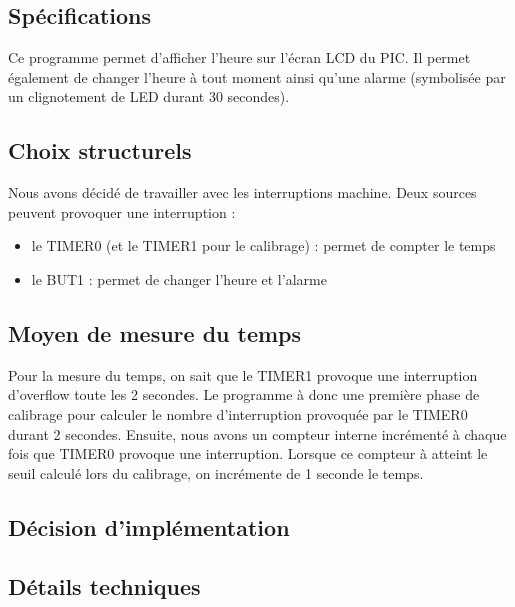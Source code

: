 \subsection*{Spécifications}

Ce programme permet d'afficher l'heure sur l'écran LCD du PIC. Il permet également de changer l'heure à tout moment ainsi qu'une alarme (symbolisée par un clignotement de LED durant 30 secondes).

\subsection*{Choix structurels}

Nous avons décidé de travailler avec les interruptions machine. Deux sources peuvent provoquer une interruption :
\begin{itemize}
	\item le TIMER0 (et le TIMER1 pour le calibrage) : permet de compter le temps
	\item le BUT1 : permet de changer l'heure et l'alarme 
\end{itemize}


\subsection*{Moyen de mesure du temps}

Pour la mesure du temps, on sait que le TIMER1 provoque une interruption d'overflow toute les 2 secondes. Le programme à donc une première phase de calibrage pour calculer le nombre d'interruption provoquée par le TIMER0 durant 2 secondes. Ensuite, nous avons un compteur interne incrémenté à chaque fois que TIMER0 provoque une interruption. Lorsque ce compteur à atteint le seuil calculé lors du calibrage, on incrémente de 1 seconde le temps.

\subsection*{Décision d'implémentation}

\subsection*{Détails techniques}

